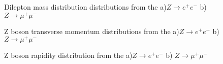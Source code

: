 \begin{figure}[h]
\begin{minipage}[h]{0.49\linewidth}
\end{minipage}
\hfill
\begin{minipage}[h]{0.49\linewidth}
\end{minipage}
\caption{Dilepton mass distribution distributions from the a)$Z\to e^{+}e^{-}$ b) $Z\to \mu^{+}\mu^{-}$}
\label{fig:CPMassZ}
\end{figure}

\begin{figure}[h]
\begin{minipage}[h]{0.49\linewidth}
\end{minipage}
\hfill
\begin{minipage}[h]{0.49\linewidth}
\end{minipage}

\caption{ Z boson transverse momentum distributions from the a)$Z\to e^{+}e^{-}$ b) $Z\to \mu^{+}\mu^{-}$}
\end{figure}


\begin{figure}[h]
\begin{minipage}[h]{0.49\linewidth}
\end{minipage}
\hfill
\begin{minipage}[h]{0.49\linewidth}
\end{minipage}

\caption{ Z boson rapidity distribution from the a)$Z\to e^{+}e^{-}$ b) $Z\to \mu^{+}\mu^{-}$}
\label{ris:Zll2}
\end{figure}
